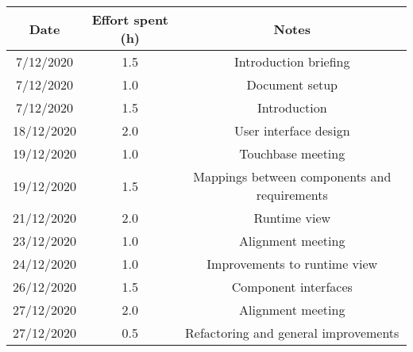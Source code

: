 \documentclass[../../main.tex]{subfiles}
\begin{document}
\begin{center}
    \begin{tabular}{|c| |c| |c|} 
        \hline
        Date & Effort spent (h) & Notes\\ [0.5ex] 
        \hline\hline
        7/12/2020 & 1.5 & Introduction briefing\\ 
        7/12/2020 & 1.0 & Document setup\\
        7/12/2020 & 1.5 & Introduction\\
        18/12/2020 & 2.0 & User interface design\\
        19/12/2020 & 1.0 & Touchbase meeting\\
        19/12/2020 & 1.5 & Mappings between components and requirements\\
        21/12/2020 & 2.0 & Runtime view\\
        23/12/2020 & 1.0 & Alignment meeting\\
        24/12/2020 & 1.0 & Improvements to runtime view\\
        26/12/2020 & 1.5 & Component interfaces\\
        27/12/2020 & 2.0 & Alignment meeting\\
        27/12/2020 & 0.5 & Refactoring and general improvements\\
        \hline
    \end{tabular}
\end{center}
\end{document}
